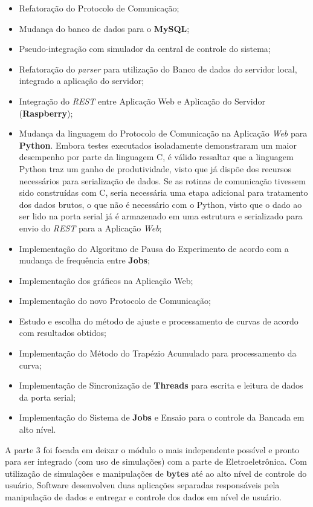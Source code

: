 \begin{itemize}
  \item Refatoração do Protocolo de Comunicação;
  \item Mudança do banco de dados para o \textbf{MySQL};
  \item Pseudo-integração com simulador da central de controle do sistema;
  \item Refatoração do \textit{parser} para utilização do Banco de dados do servidor local, integrado a aplicação do servidor;
  \item Integração do \textit{REST} entre Aplicação Web e Aplicação do Servidor (\textbf{Raspberry});
  \item Mudança da linguagem do Protocolo de Comunicação na Aplicação \textit{Web} para \textbf{Python}. Embora testes executados isoladamente demonstraram um maior desempenho por parte da linguagem C, é válido ressaltar que a linguagem Python traz um ganho de produtividade, visto que já dispõe dos recursos necessários para serialização de dados. Se as rotinas de comunicação tivessem sido construídas com C, seria necessária uma etapa adicional para tratamento dos dados brutos, o que não é necessário com o Python, visto que o dado ao ser lido na porta serial já é armazenado em uma estrutura e serializado para envio do \textit{REST} para a Aplicação \textit{Web};
  \item Implementação do Algoritmo de Pausa do Experimento de acordo com a mudança de frequência entre \textbf{Jobs};
  \item Implementação dos gráficos na Aplicação Web;
  \item Implementação do novo Protocolo de Comunicação;
  \item Estudo e escolha do método de ajuste e processamento de curvas de acordo com resultados obtidos;
  \item Implementação do Método do Trapézio Acumulado para processamento da curva;
  \item Implementação de Sincronização de \textbf{Threads} para escrita e leitura de dados da porta serial;
  \item Implementação do Sistema de \textbf{Jobs} e Ensaio para o controle da Bancada em alto nível.
\end{itemize}

A parte 3 foi focada em deixar o módulo o mais independente possível e pronto para ser integrado (com uso de simulações) com a parte de Eletroeletrônica. Com utilização de simulações e manipulações de \textbf{bytes} até ao alto nível de controle do usuário, Software desenvolveu duas aplicações separadas responsáveis pela manipulação de dados e entregar e controle dos dados em nível de usuário.

